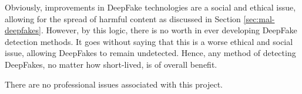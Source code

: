 Obviously, improvements in DeepFake technologies are a social and ethical issue, allowing for the spread of harmful content as discussed in Section \ref{sec:mal-deepfakes}. However, by this logic, there is no worth in ever developing DeepFake detection methods. It goes without saying that this is a worse ethical and social issue, allowing DeepFakes to remain undetected. Hence, any method of detecting DeepFakes, no matter how short-lived, is of overall benefit.

There are no professional issues associated with this project.